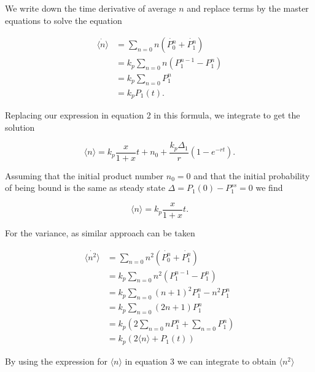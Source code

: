 We write down the time derivative of average $n$ and replace terms by the master equations to solve the equation

\begin{equation*}
\begin{aligned}
\dot{ \langle n \rangle } & = \sum_{n=0} n (\dot{P_0^n} + \dot{P_1^n})\\
                          & = k_p \sum_{n=0} n (P_1^{n-1} - P_1^n)\\
                          & = k_p \sum_{n=0} P_1^{n}\\
                          & = k_p P_1(t).
\end{aligned}
\end{equation*}

Replacing our expression in equation 2 in this formula, we integrate to get the solution

\begin{equation}
\langle n \rangle = k_p \frac{x}{1+x}t + n_0 + \frac{k_p \Delta_1}{r}(1-e^{-rt}).
\end{equation}

Assuming that the initial product number $n_0=0$ and that the initial probability of being bound is the same as steady state $\Delta = P_1(0) - P_1^{ss} = 0$ we find

\begin{equation*}
\langle n \rangle = k_p \frac{x}{1+x}t.
\end{equation*}

For the variance, as similar approach can be taken

\begin{equation*}
\begin{aligned}
\dot{ \langle n^2 \rangle } & = \sum_{n=0} n^2 (\dot{P_0^n} + \dot{P_1^n})\\
                          & = k_p \sum_{n=0} n^2 (P_1^{n-1} - P_1^n)\\
                          & = k_p \sum_{n=0} (n+1)^2 P_1^{n} - n^2 P_1^n\\
                          & = k_p \sum_{n=0} (2n+1)P_1^{n}\\
                          & = k_p (2 \sum_{n=0}nP_1^{n} + \sum_{n=0}P_1^{n})\\
                          & = k_p (2 \langle n \rangle + P_1(t))
\end{aligned}
\end{equation*}

By using the expression for $\langle n \rangle$ in equation 3 we can integrate to obtain $\langle n^2 \rangle$

